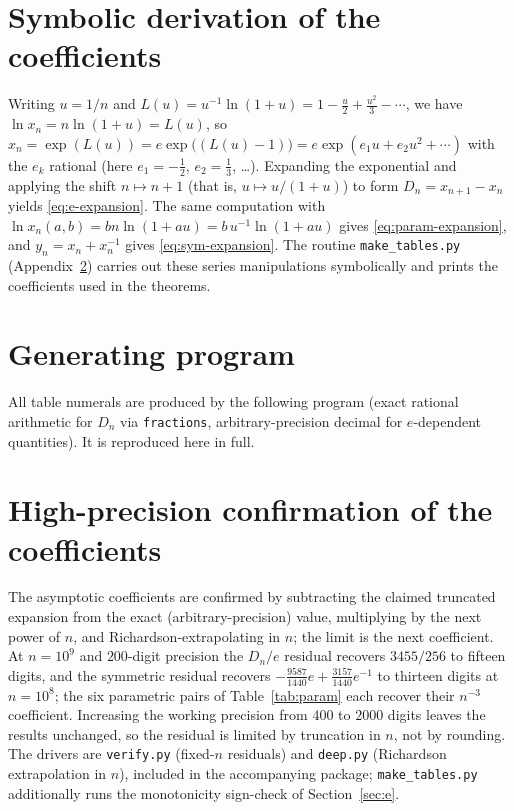 \documentclass[11pt]{article}
\theoremstyle{plain}
\theoremstyle{remark}
\begin{document}
\appendix

\section{Symbolic derivation of the coefficients}
\label{app:deriv}
Writing $u = 1/n$ and $L(u) = u^{-1}\ln(1+u) = 1 - \tfrac{u}{2} + \tfrac{u^2}{3}
- \cdots$, we have $\ln x_n = n\ln(1+u) = L(u)$, so
$x_n = \exp(L(u)) = e\exp\bigl((L(u)-1)\bigr)
     = e\exp(e_1 u + e_2 u^2 + \cdots)$ with the
$e_k$ rational (here $e_1 = -\tfrac12$, $e_2 = \tfrac13$, \dots). Expanding the
exponential and applying the shift $n\mapsto n+1$
(that is, $u \mapsto u/(1+u)$) to form $D_n = x_{n+1}-x_n$ yields
\eqref{eq:e-expansion}. The same computation with
$\ln x_n(a,b) = bn\ln(1+au) = b\,u^{-1}\ln(1+au)$
gives \eqref{eq:param-expansion}, and $y_n = x_n + x_n^{-1}$ gives
\eqref{eq:sym-expansion}. The routine \texttt{make\_tables.py}
(Appendix~\ref{app:code}) carries out these series manipulations symbolically and
prints the coefficients used in the theorems.

\section{Generating program}
\label{app:code}
All table numerals are produced by the following program (exact rational
arithmetic for $D_n$ via \texttt{fractions}, arbitrary-precision decimal for
$e$-dependent quantities). It is reproduced here in full.



\section{High-precision confirmation of the coefficients}
\label{app:num}
The asymptotic coefficients are confirmed by subtracting the claimed truncated
expansion from the exact (arbitrary-precision) value, multiplying by the next
power of $n$, and Richardson-extrapolating in $n$; the limit is the next
coefficient. At $n = 10^{9}$ and $200$-digit precision the $D_n/e$ residual
recovers $3455/256$ to fifteen digits, and the symmetric residual recovers
$-\tfrac{9587}{1440}e + \tfrac{3157}{1440}e^{-1}$ to thirteen digits at
$n=10^{8}$; the six parametric pairs of Table~\ref{tab:param} each recover their
$n^{-3}$ coefficient. Increasing the working precision from $400$ to $2000$
digits leaves the results unchanged, so the residual is limited by truncation in
$n$, not by rounding. The drivers are \texttt{verify.py} (fixed-$n$ residuals) and
\texttt{deep.py} (Richardson extrapolation in $n$), included in the accompanying
package; \texttt{make\_tables.py} additionally runs the monotonicity sign-check
of Section~\ref{sec:e}.
\end{document}

